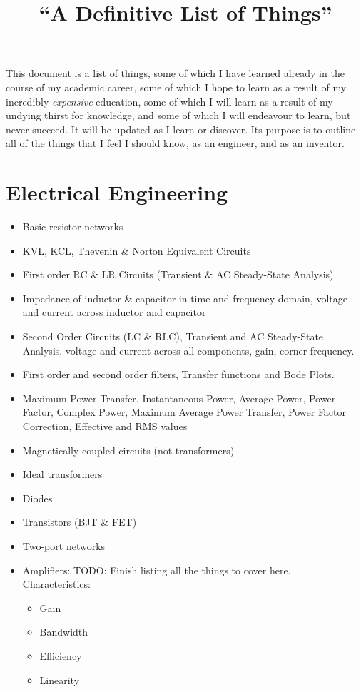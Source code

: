 \documentclass[a4paper]{article}
\begin{document}
\title{``A Definitive List of Things''}

This document is a list of things, some of which I have learned already in the
course of my academic career, some of which I hope to learn as a result of my
incredibly \emph{expensive} education, some of which I will learn as a result
of my undying thirst for knowledge, and some of which I will endeavour to learn,
but never succeed. It will be updated as I learn or discover. Its purpose is to
outline all of the things that I feel I should know, as an engineer, and as an
inventor.

\section{Electrical Engineering}
\begin{itemize}
\item Basic resistor networks
\item KVL, KCL, Thevenin \& Norton Equivalent Circuits
\item First order RC \& LR Circuits (Transient \& AC Steady-State Analysis)
\item Impedance of inductor \& capacitor in time and frequency domain, voltage
  and current across inductor and capacitor
\item Second Order Circuits (LC \& RLC), Transient and AC Steady-State Analysis,
  voltage and current across all components, gain, corner frequency.
\item First order and second order filters, Transfer functions and Bode Plots.
\item Maximum Power Transfer, Instantaneous Power, Average Power, Power Factor,
  Complex Power, Maximum Average Power Transfer, Power Factor Correction,
  Effective and RMS values
\item Magnetically coupled circuits (not transformers)
\item Ideal transformers
\item Diodes
\item Transistors (BJT \& FET)
\item Two-port networks
\item Amplifiers: TODO: Finish listing all the things to cover here.\\
  Characteristics:
  \begin{itemize}
  \item Gain
  \item Bandwidth
  \item Efficiency
  \item Linearity

\end{itemize}
\end{itemize}
\end{document}
